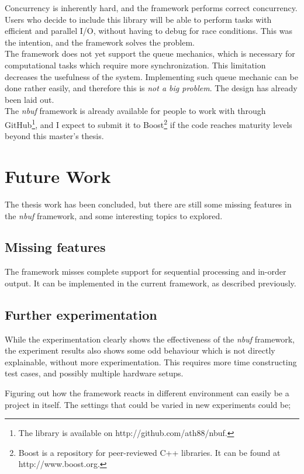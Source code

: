 \documentclass[a4paper]{article}
\newcommand{\nbuf}{\textit{nbuf} }
\begin{document}
Concurrency is inherently hard, and the framework performs correct concurrency. Users who decide to include this library will be able to perform tasks with efficient and parallel I/O, without having to debug for race conditions. This was the intention, and the framework solves the problem.\\

The framework does not yet support the queue mechanics, which is necessary for computational tasks which require more synchronization. This limitation decreases the usefulness of the system. Implementing such queue mechanic can be done rather easily, and therefore this is \textit{not a big problem}. The design has already been laid out.\\

The \nbuf framework is already available for people to work with through GitHub\footnote{The library is available on http://github.com/ath88/nbuf.}, and I expect to submit it to Boost\footnote{Boost is a repository for peer-reviewed C++ libraries. It can be found at http://www.boost.org.} if the code reaches maturity levels beyond this master's thesis.


\newpage
\section{Future Work}
The thesis work has been concluded, but there are still some missing features in the \nbuf framework, and some interesting topics to explored. 

\subsection{Missing features}
The framework misses complete support for sequential processing and in-order output. It can be implemented in the current framework, as described previously.


\subsection{Further experimentation}
While the experimentation clearly shows the effectiveness of the \nbuf framework, the experiment results also shows some odd behaviour which is not directly explainable, without more experimentation. This requires more time constructing test cases, and possibly multiple hardware setups.

Figuring out how the framework reacts in different environment can easily be a project in itself. The settings that could be varied in new experiments could be;
\end{document}
